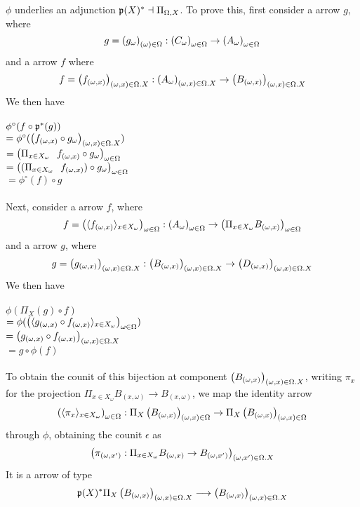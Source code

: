 \documentclass[sigplan,10pt,review,anonymous]{acmart}
\newcommand{\fm}[2]{
\left(
\tiny
#1
\normalsize
\right)_{#2}
}
\begin{document}
$\phi$ underlies an adjunction $\frak p(X)^* \dashv \Pi_{\Omega, X}$. To prove this, first consider a arrow $g$, where $$g = \fm{g_{\omega}}{(\omega) \in \Omega} : \fm{C_{\omega}}{\omega \in \Omega} \to \fm{A_\omega}{\omega \in \Omega}$$
and a arrow $f$ where
$$f = \fm{f_{(\omega,x)}}{(\omega,x) \in \Omega . X} : \fm{A_\omega}{(\omega,x) \in \Omega . X} \to \fm{B_{(\omega, x)}}{(\omega,x) \in \Omega . X}$$
We then have\\~\\
$\phi^\circ(f \circ \frak p^*(g))$\\
$= \phi^\circ( \fm{f_{(\omega,x)} \circ g_{\omega}}{(\omega,x) \in \Omega.X} )$\\
$= \fm{\Pi_{x \in X_{\omega}}~~~f_{(\omega,x)} \circ g_\omega}{\omega \in \Omega}$\\
$= \fm{(\Pi_{x \in X_{\omega}}~~~f_{(\omega,x)}) \circ g_\omega}{\omega \in \Omega}$\\
$= \phi^\circ(f) \circ g$\\~\\
Next, consider a arrow $f$, where
$$f = \fm{\langle f_{(\omega,x)} \rangle_{x \in X_\omega}}{\omega \in \Omega} : \fm{A_\omega}{\omega \in \Omega} \to \fm{\Pi_{x \in X_\omega} B_{(\omega,x)}}{\omega \in \Omega}$$
and a arrow $g$, where
$$g = \fm{g_{(\omega,x)}}{(\omega,x) \in \Omega . X} : \fm{B_{(\omega,x)}}{(\omega,x) \in \Omega . X} \to \fm{D_{(\omega,x)}}{(\omega,x) \in \Omega . X}$$
We then have\\~\\
$\phi(\Pi_{X}(g) \circ f)$\\
$= \phi( \fm{\langle g_{(\omega, x)} \circ f_{(\omega,x)} \rangle_{x \in X_\omega} }{\omega \in \Omega} )$\\ 
\vspace{0.5ex}$= \fm{g_{(\omega, x)} \circ f_{(\omega,x)}}{(\omega, x) \in \Omega . X}$\\
$= g \circ \phi(f)$\\~\\
To obtain the counit of this bijection at component $\fm{B_{(\omega, x)}}{(\omega,x) \in \Omega.X}$, writing $\pi_x$ for the projection $\Pi_{x \in X_\omega} B_{(x,\omega)} \to B_{(x,\omega)}$, we map the identity arrow $$\fm{\langle \pi_x \rangle_{x \in X_\omega}}{\omega \in \Omega} : \Pi_X \fm{B_{(\omega,x)}}{(\omega,x) \in \Omega} \to \Pi_X \fm{B_{(\omega,x)}}{(\omega,x) \in \Omega}$$ through $\phi$, obtaining the counit $\epsilon$ as $$\fm{\pi_{(\omega,x')} : \Pi_{x \in X_\omega} B_{(\omega,x)} \to B_{(\omega,x')}}{(\omega,x') \in \Omega . X}$$ It is a arrow of type
$$\frak p(X)^* \Pi_X \fm{B_{(\omega,x)}}{(\omega,x) \in \Omega . X} \longrightarrow \fm{B_{(\omega,x)}}{(\omega,x) \in \Omega . X}$$
\end{document}

